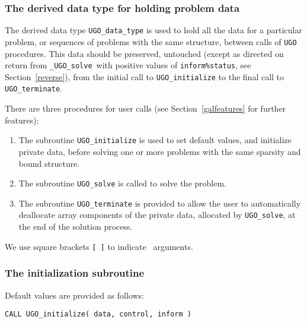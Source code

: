 \documentclass{galahad}
\newcommand{\packagename}{UGO}
\newcommand{\fullpackagename}{\libraryname\_\packagename}
\newcommand{\solver}{{\tt \fullpackagename\_solve}}
\begin{document}
\subsubsection{The derived data type for holding problem data}\label{typedata}
The derived data type
{\tt \packagename\_data\_type}
is used to hold all the data for a particular problem,
or sequences of problems with the same structure, between calls of
{\tt \packagename} procedures.
This data should be preserved, untouched (except as directed on
return from \solver\ with positive values of {\tt inform\%status}, see
Section~\ref{reverse}),
from the initial call to
{\tt \packagename\_initialize}
to the final call to
{\tt \packagename\_terminate}.





\galarguments
There are three procedures for user calls
(see Section~\ref{galfeatures} for further features):

\begin{enumerate}
\item The subroutine
      {\tt \packagename\_initialize}
      is used to set default values, and initialize private data,
      before solving one or more problems with the
      same sparsity and bound structure.
\item The subroutine
      {\tt \packagename\_solve}
      is called to solve the problem.
\item The subroutine
      {\tt \packagename\_terminate}
      is provided to allow the user to automatically deallocate array
      components of the private data, allocated by
      {\tt \packagename\_solve},
      at the end of the solution process.
\end{enumerate}
We use square brackets {\tt [ ]} to indicate \optional\ arguments.


\subsubsection{The initialization subroutine}\label{subinit}
 Default values are provided as follows:
\vspace*{1mm}

\hspace{8mm}
{\tt CALL \packagename\_initialize( data, control, inform )}
\end{document}
